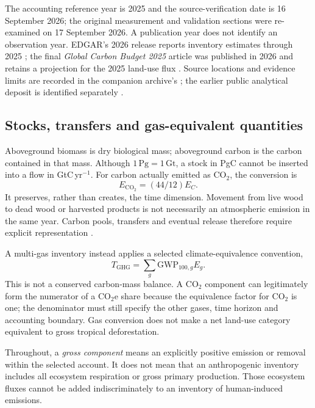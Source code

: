 \documentclass[11pt,a4paper]{article}
\newcommand{\COtwo}{\ensuremath{\mathrm{CO}_2}}
\newcommand{\COtwoe}{\ensuremath{\mathrm{CO}_2\mathrm{e}}}
\theoremstyle{remark}
\begin{document}
The accounting reference year is 2025 and the source-verification date is 16 September 2026; the original measurement and validation sections were re-examined on 17 September 2026. A publication year does not identify an observation year. EDGAR's 2026 release reports inventory estimates through 2025 \citep{Crippa2026}; the final \emph{Global Carbon Budget 2025} article was published in 2026 and retains a projection for the 2025 land-use flux \citep{Friedlingstein2026}. Source locations and evidence limits are recorded in the companion archive's ; the earlier public analytical deposit is identified separately \citep{Repository2026}.

\subsection{Stocks, transfers and gas-equivalent quantities}
Aboveground biomass is dry biological mass; aboveground carbon is the carbon contained in that mass. Although $1\,\mathrm{Pg}=1\,\mathrm{Gt}$, a stock in PgC cannot be inserted into a flow in GtC\,yr$^{-1}$. For carbon actually emitted as \COtwo{}, the conversion is
\begin{equation}
E_{\COtwo}=(44/12)E_C.
\label{eq:conversion}
\end{equation}
It preserves, rather than creates, the time dimension. Movement from live wood to dead wood or harvested products is not necessarily an atmospheric emission in the same year. Carbon pools, transfers and eventual release therefore require explicit representation \citep{IPCC2006}.

A multi-gas inventory instead applies a selected climate-equivalence convention,
\begin{equation}
T_{\mathrm{GHG}}=\sum_g \mathrm{GWP}_{100,g}E_g.
\label{eq:gwp}
\end{equation}
This is not a conserved carbon-mass balance. A \COtwo{} component can legitimately form the numerator of a \COtwoe{} share because the equivalence factor for \COtwo{} is one; the denominator must still specify the other gases, time horizon and accounting boundary. Gas conversion does not make a net land-use category equivalent to gross tropical deforestation.

Throughout, a \emph{gross component} means an explicitly positive emission or removal within the selected account. It does not mean that an anthropogenic inventory includes all ecosystem respiration or gross primary production. Those ecosystem fluxes cannot be added indiscriminately to an inventory of human-induced emissions.
\end{document}
